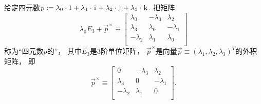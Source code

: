 \begin{definition}
给定四元数\(
	p
	:=
	\lambda_0 \cdot 1
	+ \lambda_1 \cdot \kern1pt\mathrm{i}\kern1pt
	+ \lambda_2 \cdot \kern1pt\mathrm{j}\kern1pt
	+ \lambda_3 \cdot \kern1pt\mathrm{k}\kern1pt
\).
把矩阵\begin{equation}
	\lambda_0 E_3 + \vec{p}^\times
	\equiv
	\begin{bmatrix}
		\lambda_0 & -\lambda_3 & \lambda_2 \\
		\lambda_3 & \lambda_0 & -\lambda_1 \\
		-\lambda_2 & \lambda_1 & \lambda_0 \\
	\end{bmatrix}
\end{equation}
称为“四元数\(p\)的”，
其中\(E_3\)是3阶单位矩阵，
\(\vec{p}^\times\)是向量\(\vec{p} \equiv (\lambda_1,\lambda_2,\lambda_3)^T\)的外积矩阵，
即\begin{equation*}
	\vec{p}^\times
	\equiv
	\begin{bmatrix}
		0 & -\lambda_3 & \lambda_2 \\
		\lambda_3 & 0 & -\lambda_1 \\
		-\lambda_2 & \lambda_1 & 0 \\
	\end{bmatrix}.
\end{equation*}
\end{definition}

